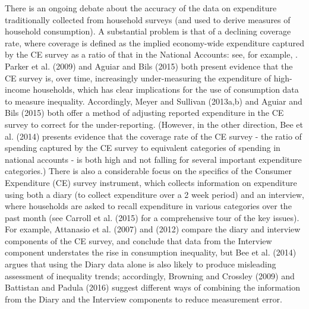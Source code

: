 There is an ongoing debate about the accuracy of the data on expenditure traditionally collected from household surveys (and used to derive measures of household consumption). A substantial problem is that of a declining coverage rate, where coverage is defined as the implied economy-wide expenditure captured by the CE survey as a ratio of that in the National Accounts: see, for example, \citet{Barrettetal2014}. Parker et al. (2009) and Aguiar and Bils (2015) both present evidence that the CE survey is, over time, increasingly under-measuring the expenditure of high-income households, which has clear implications for the use of consumption data to measure inequality. Accordingly, Meyer and Sullivan (2013a,b) and Aguiar and Bils (2015) both offer a method of adjusting reported expenditure in the CE survey to correct for the under-reporting. (However, in the other direction, Bee et al. (2014) presents evidence that the coverage rate of the CE survey - the ratio of spending captured by the CE survey to equivalent categories of spending in national accounts - is both high and not falling for several important expenditure categories.) There is also a considerable focus on the specifics of the Consumer Expenditure (CE) survey instrument, which collects information on expenditure using both a diary (to collect expenditure over a 2 week period) and an interview, where households are asked to recall expenditure in various categories over the past month (see Carroll et al. (2015) for a comprehensive tour of the key issues). For example, Attanasio et al. (2007) and (2012) compare the diary and interview components of the CE survey, and conclude that data from the Interview component understates the rise in consumption inequality, but Bee et al. (2014) argues that using the Diary data alone is also likely to produce misleading assessment of inequality trends; accordingly, Browning and Crossley (2009) and Battistan and Padula (2016) suggest different ways of combining the information from the Diary and the Interview components to reduce measurement error. 

